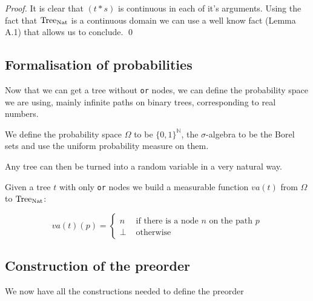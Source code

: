 \begin{proof}
    It is clear that $(t*s)$ is continuous in each of it's 
    arguments. Using the fact that $\textnormal{Tree}_{\textnormal{Nat}}$ is a 
    continuous domain we can use a well know fact 
    \cite{battenfeld2009two} (Lemma A.1) that allows us to conclude.
    \qed
\end{proof}


\subsection{Formalisation of probabilities}

Now that we can get a tree without \texttt{or} nodes,
we can define the probability space we are using, mainly 
infinite paths on binary trees, corresponding to real numbers.

\begin{definition}
    We define the probability space $\Omega$
    to be $\{0,1\}^\mathbb{N}$, the 
    $\sigma$-algebra to be the Borel sets 
    and use the uniform probability measure on them.
\end{definition}

Any tree can then be turned into a random variable in 
a very natural way. 

\begin{definition}
    Given a tree $t$ with only \texttt{or} nodes we 
    build a measurable function $va(t)$ from $\Omega$ to $\textnormal{Tree}_{\textnormal{Nat}}$:

    \begin{equation*}
        va(t)(p) = \begin{cases}
            n  & \text{ if there is a node } n \text{ on the path } p \\
            \bot & \text{ otherwise } 
        \end{cases}
    \end{equation*}
\end{definition}


\subsection{Construction of the preorder}

We now have all the constructions needed to define the preorder

